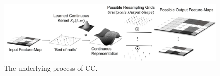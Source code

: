 \begin{figure}
    \centering
    \hspace*{-0.5cm} \includegraphics[width=1.05\textwidth]{figs/fig_underlying2.jpg}
    \caption{The underlying process of CC.
    }
    \label{fig:underlying}
\end{figure}











